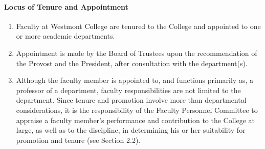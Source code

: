 \documentclass[letterpaper, 11pt]{article}
\begin{document}
			\paragraph{Locus of Tenure and Appointment}
				\begin{enumerate}[label=\alph*)]
					\item{Faculty at Westmont College are tenured to the College and appointed to one or more academic departments.}
					\item{Appointment is made by the Board of Trustees upon the recommendation of the Provost and the President, after consultation with the department(s).}
					\item{Although the faculty member is appointed to, and functions primarily as, a professor of a department, faculty responsibilities are not limited to the department.  Since tenure and promotion involve more than departmental considerations, it is the responsibility of the Faculty Personnel Committee to appraise a faculty member's performance and contribution to the College at large, as well as to the discipline, in determining his or her suitability for promotion and tenure (see Section 2.2).}
				\end{enumerate}
\end{document}
